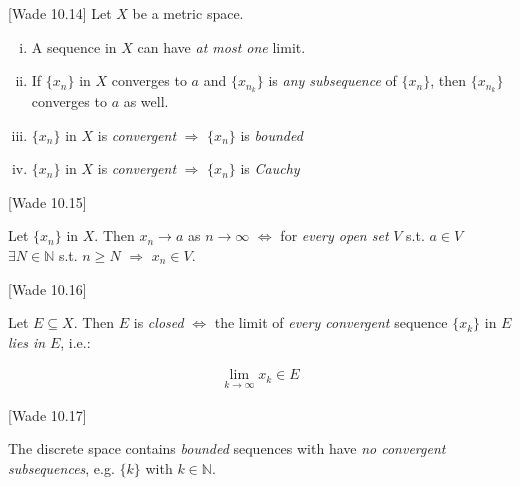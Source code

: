 \documentclass[10pt]{article} %
\newcommand{\cw}[1]{[Wade #1]}
\renewcommand{\geq}{\geqslant}
\begin{document}
\begin{multicols}{3}
\begin{theorem}{\cw{10.14}}{}
    Let $X$ be a metric space.

        \begin{enumerate}[i)]
            \setlength{\parskip}{0em}
            \item A sequence in $X$ can have \emph{at most one} limit.
            \item If $\{x_n\}$ in $X$ converges to $a$ and $\{x_{n_k}\}$ is \emph{any subsequence} of $\{x_n\}$, then $\{x_{n_k}\}$ converges to $a$ as well.
            \item $\{x_n\}$ in $X$ is \emph{convergent} $\Rightarrow$ $\{x_n\}$ is \emph{bounded}
            \item $\{x_n\}$ in $X$ is \emph{convergent} $\Rightarrow$ $\{x_n\}$ is \emph{Cauchy}
        \end{enumerate}

\end{theorem}

\begin{remark}{\cw{10.15}}{}

    Let $\{x_n\}$ in $X$. Then $x_n \to a$ as $n \to \infty$ $\Leftrightarrow$ for \emph{every open set} $V$ s.t. $a \in V$ $\exists N \in \mathbb{N}$ s.t. $n \geq N$ $\Rightarrow$ $x_n \in V$.

\end{remark}

\begin{theorem}{\cw{10.16}}{}

    Let $E \subseteq X$. Then $E$ is \emph{closed} $\Leftrightarrow$ the limit of \emph{every convergent} sequence $\{x_k\}$ in $E$ \emph{lies in} $E$, i.e.:

        \begin{align*}
            \lim_{k \to \infty} x_k \in E
        \end{align*}

\end{theorem}

\begin{remark}{\cw{10.17}}{}

    The discrete space contains \emph{bounded} sequences with have \emph{no convergent subsequences}, e.g. $\{k\}$ with $k \in \mathbb{N}$.

\end{remark}


\end{multicols}
\end{document}
